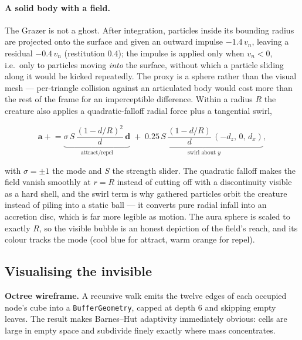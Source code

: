 \documentclass[10pt,a4paper]{article}
\newcommand{\code}[1]{\texttt{\small #1}}
\begin{document}
\paragraph{A solid body with a field.} The Grazer is not a ghost. After integration, particles inside its
bounding radius are projected onto the surface and given an outward impulse $-1.4\,v_n$, leaving a residual
$-0.4\,v_n$ (restitution $0.4$); the impulse is applied only when $v_n<0$, i.e.\ only to particles moving
\emph{into} the surface, without which a particle sliding along it would be kicked repeatedly. The proxy is
a sphere rather than the visual mesh --- per-triangle collision against an articulated body would cost more
than the rest of the frame for an imperceptible difference. Within a radius $R$ the creature also applies a
quadratic-falloff radial force plus a tangential swirl,

\begin{equation}
\mathbf{a} \mathrel{+}= \underbrace{\sigma\,S\,\frac{(1-d/R)^2}{d}\,\mathbf{d}}_{\text{attract/repel}}
\;+\;
\underbrace{0.25\,S\,\frac{(1-d/R)}{d}\,(-d_z,\,0,\,d_x)}_{\text{swirl about }y},
\end{equation}

\noindent with $\sigma=\pm1$ the mode and $S$ the strength slider. The quadratic falloff makes the field
vanish smoothly at $r=R$ instead of cutting off with a discontinuity visible as a hard shell, and the swirl
term is why gathered particles orbit the creature instead of piling into a static ball --- it converts pure
radial infall into an accretion disc, which is far more legible as motion. The aura sphere is scaled to
exactly $R$, so the visible bubble is an honest depiction of the field's reach, and its colour tracks the
mode (cool blue for attract, warm orange for repel).

\subsection{Visualising the invisible}
\label{sec:viz}

\textbf{Octree wireframe.} A recursive walk emits the twelve edges of each occupied node's cube into a
\code{BufferGeometry}, capped at depth 6 and skipping empty leaves. The result makes Barnes--Hut adaptivity
immediately obvious: cells are large in empty space and subdivide finely exactly where mass concentrates.
\end{document}
